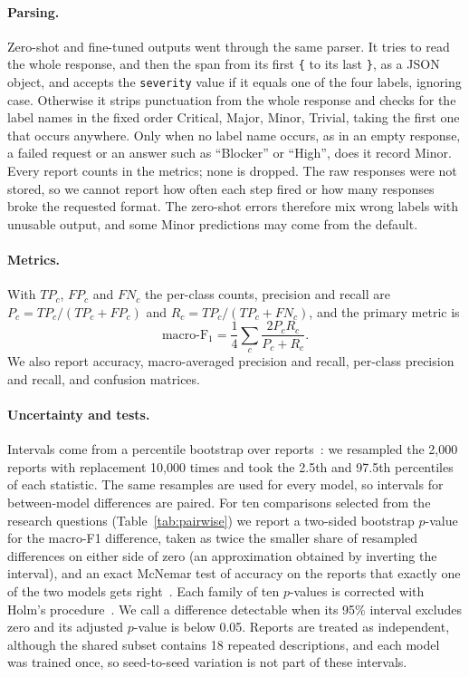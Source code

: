 \documentclass[a4paper,fleqn]{cas-sc}
\begin{document}
\paragraph{Parsing.} Zero-shot and fine-tuned outputs went through the same parser.
It tries to read the whole response, and then the span from its first \texttt{\{} to its
last \texttt{\}}, as a JSON object, and accepts the \texttt{severity} value if it equals
one of the four labels, ignoring case. Otherwise it strips punctuation from the whole
response and checks for the label names in the fixed order Critical, Major, Minor,
Trivial, taking the first one that occurs anywhere. Only when no label name occurs, as
in an empty response, a failed request or an answer such as ``Blocker'' or ``High'', does
it record Minor. Every report counts in the metrics; none is dropped. The raw responses
were not stored, so we cannot report how often each step fired or how many responses
broke the requested format. The zero-shot errors therefore mix wrong labels with
unusable output, and some Minor predictions may come from the default.

\paragraph{Metrics.} With $TP_c$, $FP_c$ and $FN_c$ the per-class counts, precision
and recall are $P_c=TP_c/(TP_c+FP_c)$ and $R_c=TP_c/(TP_c+FN_c)$, and the primary
metric is
\begin{equation}
  \text{macro-F}_1=\frac{1}{4}\sum_{c}\frac{2P_cR_c}{P_c+R_c}.
  \label{eq:f1}
\end{equation}
We also report accuracy, macro-averaged precision and recall, per-class precision and
recall, and confusion matrices.

\paragraph{Uncertainty and tests.} Intervals come from a percentile bootstrap over
reports~\citep{efron1993introduction}: we resampled the 2,000 reports with replacement
10,000 times and took the 2.5th and 97.5th percentiles of each statistic. The same
resamples are used for every model, so intervals for between-model differences are
paired. For ten comparisons selected from the research questions
(Table~\ref{tab:pairwise}) we report a two-sided bootstrap $p$-value for the macro-F1
difference, taken as twice the smaller share of resampled differences on either side of
zero (an approximation obtained by inverting the interval), and an exact McNemar test of
accuracy on the reports that exactly one of the two models gets
right~\citep{mcnemar1947note,dietterich1998approximate}. Each family of ten $p$-values is
corrected with Holm's procedure~\citep{holm1979simple}. We call a difference detectable
when its 95\% interval excludes zero and its adjusted $p$-value is below 0.05. Reports are
treated as independent, although the shared subset contains 18 repeated descriptions,
and each model was trained once, so seed-to-seed variation is not part of these
intervals.
\end{document}
